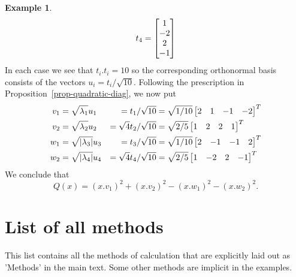 \documentclass[reqno]{amsart}
\theoremstyle{definition}
\newtheorem{example}[theorem]{Example}
\begin{document}
\begin{example}
\[    t_4 = \left[\begin{matrix}  1 \\ -2 \\  2 \\ -1 \end{matrix}\right] 
 \]
 In each case we see that $t_i.t_i=10$ so the corresponding
 orthonormal basis consists of the vectors $u_i=t_i/\sqrt{10}$.
 Following the prescription in Proposition~\ref{prop-quadratic-diag},
 we now put 
 \begin{align*}
  v_1 &= \sqrt{\lambda_1}u_1 &= t_1/\sqrt{10}
       &= \sqrt{1/10}\left[\begin{matrix} 2&1&-1&-2 \end{matrix}\right]^T \\
  v_2 &= \sqrt{\lambda_2}u_2 &= \sqrt{4}t_2/\sqrt{10}
       &= \sqrt{2/5}\left[\begin{matrix} 1&2&2&1 \end{matrix}\right]^T \\
  w_1 &= \sqrt{|\lambda_3|}u_3 &= t_3/\sqrt{10}
       &= \sqrt{1/10}\left[\begin{matrix} 2&-1&-1&2\end{matrix}\right]^T \\
  w_2 &= \sqrt{|\lambda_4|}u_4 &= \sqrt{4}t_4/\sqrt{10}
       &= \sqrt{2/5}\left[\begin{matrix} 1&-2&2&-1\end{matrix}\right]^T
 \end{align*}
 We conclude that 
 \[ Q(x) = (x.v_1)^2 + (x.v_2)^2 - (x.w_1)^2 - (x.w_2)^2. \]
\end{example}

\appendix

\section{List of all methods}
\label{apx-methods}

This list contains all the methods of calculation that are explicitly
laid out as 'Methods' in the main text.  Some other methods are
implicit in the examples.
\end{document}
